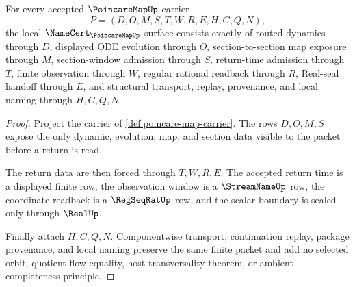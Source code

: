 \begin{theorem}
\label{thm:poincare-map-namecert-obligations}
For every accepted $\PoincareMapUp$ carrier
$$
P=(D,O,M,S,T,W,R,E,H,C,Q,N),
$$
the local $\NameCert_{\PoincareMapUp}$ surface consists exactly of routed dynamics through $D$, displayed ODE evolution through $O$, section-to-section map exposure through $M$, section-window admission through $S$, return-time admission through $T$, finite observation through $W$, regular rational readback through $R$, Real-seal handoff through $E$, and structural transport, replay, provenance, and local naming through $H,C,Q,N$.
\end{theorem}
\begin{proof}
Project the carrier of \autoref{def:poincare-map-carrier}. The rows $D,O,M,S$ expose the only dynamic, evolution, map, and section data visible to the packet before a return is read.

The return data are then forced through $T,W,R,E$. The accepted return time is a displayed finite row, the observation window is a $\StreamNameUp$ row, the coordinate readback is a $\RegSeqRatUp$ row, and the scalar boundary is sealed only through $\RealUp$.

Finally attach $H,C,Q,N$. Componentwise transport, continuation replay, package provenance, and local naming preserve the same finite packet and add no selected orbit, quotient flow equality, host transversality theorem, or ambient completeness principle.
\end{proof}

